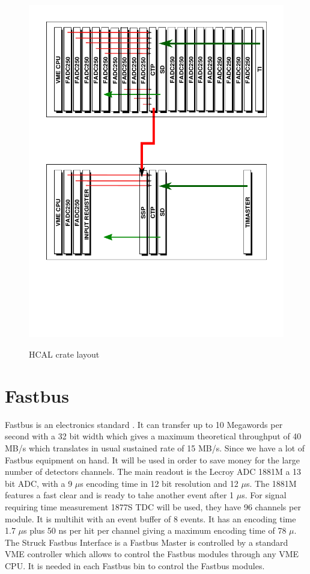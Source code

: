 \documentclass{article}
\begin{document}
\begin{figure}
  \centering
  \includegraphics[width=\textwidth]{figs/VXSHCalFADC.pdf}\\
  \caption{HCAL crate layout }\label{fig:HCALFADC}
\end{figure}

\section{Fastbus}
Fastbus is an electronics standard . It can transfer up to 10 Megawords per second with a 32 bit width which gives a maximum theoretical throughput of 40 MB/s which translates in usual sustained rate of 15 MB/s.
Since we have a lot of Fastbus equipment on hand. It will be used in order to save money for the large number of detectors channels. The main readout is the Lecroy ADC 1881M a 13 bit ADC, with a 9 $\mu$s encoding time in 12 bit resolution and 12  $\mu$s. The 1881M features a fast clear and is ready to tahe another event after 1 $\mu$s. For signal requiring time measurement 1877S TDC will be used, they have 96 channels per module. It is multihit with an event buffer of 8 events. It has an encoding time  1.7 $\mu$s plus 50 ns per hit per channel giving a maximum encoding time of 78 $\mu$. 
The Struck Fastbus Interface is a Fastbus Master is controlled by a standard VME controller which allows to control the Fastbus modules through any VME CPU. It is needed in each Fastbus bin to control the Fastbus modules.
\end{document}
